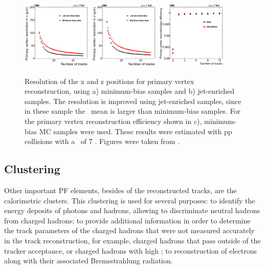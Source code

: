 \begin{figure}[ht]
  \begin{center}
    \includegraphics[width=0.3\textwidth]{figuras/Chapter3/RecoVertex_x_resolution.png}
    \includegraphics[width=0.3\textwidth]{figuras/Chapter3/RecoVertex_y_resolution.png}
    \includegraphics[width=0.3\textwidth]{figuras/Chapter3/Effciiency_vertex_resolution.png}
    \caption{Resolution of the x and z positions for primary vertex reconstruction, using a) minimum-bias samples and b) jet-enriched samples. 
    The resolution is improved using jet-enriched samples, since in these sample the \pt~mean is larger than minimum-bias samples.  
    For the primary vertex reconstruction efficiency shown in c), minimum-bias MC samples were used. These results were estimated 
    with pp collisions with a \centermassenergy~of 7 \TeV. Figures were taken from \cite{TrackAndVertexReconstruction}.}
    \label{fig:RecoVertex}
  \end{center}
\end{figure}


\subsection{Clustering}
\label{subsec:Clustering}

\noindent Other important PF elements, besides of the reconstructed tracks, are the calorimetric clusters. This
clustering is used for several purposes: to identify the 
energy deposits of photons and hadrons, allowing to discriminate neutral 
hadrons from charged hadrons; to provide additional information in order to 
determine the track parameters of the charged hadrons that were not measured 
accurately in the track reconstruction, for example, charged hadrons that pass outside 
of the tracker acceptance, or charged hadrons with high \pt; to reconstruction
of electrons along with their associated Bremsstrahlung radiation. \\


